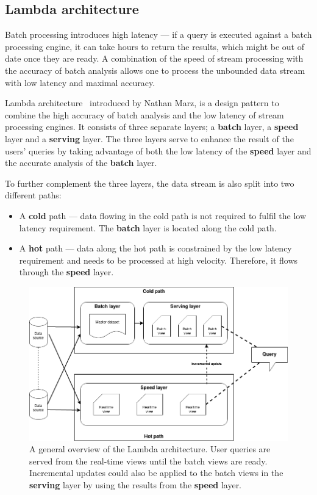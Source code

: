 \subsection{Lambda architecture}

Batch processing introduces high latency --- if a query 
is executed against a batch processing engine, it can take hours to return the results, which might be 
out of date once they are ready. A combination of the speed of stream processing with the accuracy of batch analysis
allows one to process the unbounded data stream with low latency and maximal accuracy. 

Lambda architecture~\cite{lambda_arch, lambda_arch_book, lambda_arc_bpost} introduced by Nathan Marz, is a 
design pattern to combine the high accuracy of batch analysis and the low latency of 
stream processing engines. It consists of three separate layers; a \textbf{batch} layer, 
a \textbf{speed} layer and a \textbf{serving} layer. 
The three layers serve to enhance the result of the users' queries by taking 
advantage of both the low latency of the \textbf{speed} layer and the accurate analysis of the \textbf{batch}
layer.


To further complement the three layers, 
the data stream is also split into two different paths: 
\begin{itemize}
    \item A \textbf{cold} path --- data flowing in the cold path is not required to fulfil the low
        latency requirement. The \textbf{batch} layer is located along the cold path.   
    \item A \textbf{hot} path --- data along the hot path is constrained by the low latency requirement 
        and needs to be processed at high velocity. Therefore, it flows through the 
        \textbf{speed} layer.  
\end{itemize}

\begin{figure}[!htpb]
    \centering
    \includegraphics[width=\linewidth]{fig/lambda_arch.png}
    \caption[A general overview of the Lambda architecture]
    {A general overview of the Lambda architecture. User queries are served from 
    the real-time views until the batch views are ready. Incremental updates could also be applied 
to the batch views in the \textbf{serving} layer by using the results from the \textbf{speed} layer.
~\cite{lambda_arch_book}}%
    \label{fig:lambda_arch}
\end{figure}

